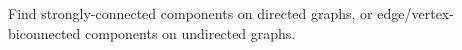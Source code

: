 Find strongly-connected components on directed graphs, or edge/vertex-biconnected components on undirected graphs.



